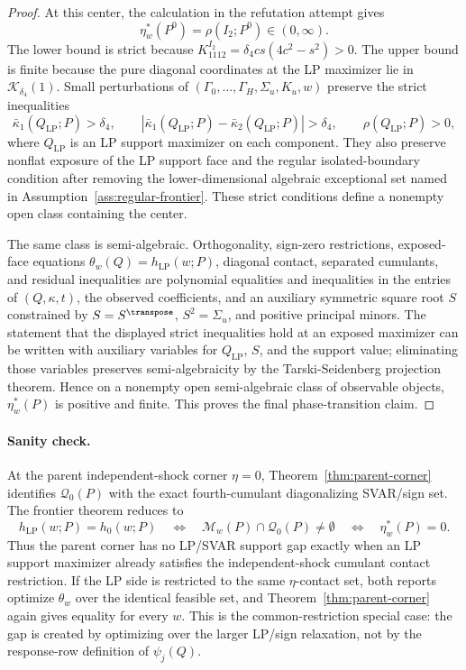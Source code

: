 \begin{proof}
At this center, the calculation in the refutation attempt gives
\[
\eta_w^*(P^0)=\rho(I_2;P^0)\in(0,\infty).
\]
The lower bound is strict because \(K^{I_2}_{1112}=\delta_4cs(4c^2-s^2)>0\).  The upper bound is finite because the pure diagonal coordinates at the LP maximizer lie in \(\mathcal K_{\delta_4}(1)\).  Small perturbations of \((\Gamma_0,\ldots,\Gamma_H,\Sigma_u,K_u,w)\) preserve the strict inequalities
\[
\bar\kappa_1(Q_{\mathrm{LP}};P)>\delta_4,\qquad
|\bar\kappa_1(Q_{\mathrm{LP}};P)-\bar\kappa_2(Q_{\mathrm{LP}};P)|>\delta_4,\qquad
\rho(Q_{\mathrm{LP}};P)>0,
\]
where \(Q_{\mathrm{LP}}\) is an LP support maximizer on each component.  They also preserve nonflat exposure of the LP support face and the regular isolated-boundary condition after removing the lower-dimensional algebraic exceptional set named in Assumption~\ref{ass:regular-frontier}.  These strict conditions define a nonempty open class containing the center.

The same class is semi-algebraic.  Orthogonality, sign-zero restrictions, exposed-face equations \(\theta_w(Q)=h_{\mathrm{LP}}(w;P)\), diagonal contact, separated cumulants, and residual inequalities are polynomial equalities and inequalities in the entries of \((Q,\kappa,t)\), the observed coefficients, and an auxiliary symmetric square root \(S\) constrained by \(S=S^\transpose\), \(S^2=\Sigma_u\), and positive principal minors.  The statement that the displayed strict inequalities hold at an exposed maximizer can be written with auxiliary variables for \(Q_{\mathrm{LP}}\), \(S\), and the support value; eliminating those variables preserves semi-algebraicity by the Tarski-Seidenberg projection theorem.  Hence on a nonempty open semi-algebraic class of observable objects, \(\eta_w^*(P)\) is positive and finite.  This proves the final phase-transition claim.
\end{proof}

\paragraph{Sanity check.}
At the parent independent-shock corner \(\eta=0\), Theorem~\ref{thm:parent-corner} identifies \(\mathcal Q_0(P)\) with the exact fourth-cumulant diagonalizing SVAR/sign set.  The frontier theorem reduces to
\[
h_{\mathrm{LP}}(w;P)=h_0(w;P)
\quad\Longleftrightarrow\quad
\mathcal M_w(P)\cap\mathcal Q_0(P)\ne\emptyset
\quad\Longleftrightarrow\quad
\eta_w^*(P)=0.
\]
Thus the parent corner has no LP/SVAR support gap exactly when an LP support maximizer already satisfies the independent-shock cumulant contact restriction.  If the LP side is restricted to the same \(\eta\)-contact set, both reports optimize \(\theta_w\) over the identical feasible set, and Theorem~\ref{thm:parent-corner} again gives equality for every \(w\).  This is the common-restriction special case: the gap is created by optimizing over the larger LP/sign relaxation, not by the response-row definition of \(\psi_j(Q)\).

